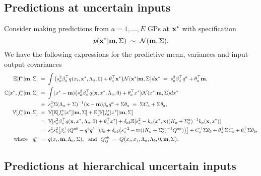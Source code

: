 \documentclass{article}
\newcommand{\bff}{{\bf f}}
\newcommand{\bfm}{{\bf m}}
\newcommand{\bfx}{{\bf x}}
\newcommand{\E}{{\mathbb E}}
\newcommand{\V}{{\mathbb V}}
\newcommand{\C}{{\mathbb C}}
\begin{document}
\subsection*{Predictions at uncertain inputs}

Consider making predictions from $a=1,\ldots,E$ GPs at $\bfx^*$ with specification
\begin{equation}
p(\bfx^*|\bfm,\Sigma)\;\sim\;{\cal N}(\bfm, \Sigma).
\end{equation}
%
We have the following expressions for the predictive mean, variances
and input output covariances
\begin{align}
\E[\bff^*|\bfm,\Sigma]\;&=\;\int\big(s_a^2\beta_a^\top
q(x_i,\bfx^*,\Lambda_a,0)+\theta_a^\top\bfx^*\big){\cal N}(\bfx^*|\bfm,\Sigma)d\bfx^*\;=\;s_a^2\beta_a^\top q^a+\theta_a^\top \bfm,\label{eq:m}\\
\C[x^*,f_a^*|\bfm,\Sigma]\;&=\;\int (x^*-\bfm)\big(s^2_a\beta_a^\top
q(\bfx,x^*,\Lambda_a,0)+\theta_a^\top x^*\big){\cal
  N}(x^*|\bfm,\Sigma)dx^*\nonumber\\
&=\;s^2_a\Sigma(\Lambda_a+\Sigma)^{-1}(\bfx-\bfm)\beta_aq^a+\Sigma\theta_a\;=\;
\Sigma C_a+\Sigma\theta_a,\label{eq:c}\\
\V[f_a^*|\bfm,\Sigma]\;&=\;\V[\E[f_a^*|x^*]|\bfm,\Sigma]+\E[\V[f_a^*|x^*]|\bfm,\Sigma]\nonumber\\
&=\;\V[s_a^2\beta_a^\top q(\bfx,x^*,\Lambda_a,0)+\theta_a^\top x^*]+\delta_{ab}\E[s_a^2-k_a(x^*,\bfx)(K_a+\Sigma_\varepsilon^a)^{-1}k_a(\bfx,x^*)]\label{eq:v}\\
&=\;s_a^2s_b^2\big[\beta_a^\top (Q^{ab}-q^aq^{b\top})\beta_b
+\delta_{ab}\big(s_a^{-2}-\operatorname{tr}((K_a+\Sigma_\varepsilon^a)^{-1}Q^{aa})\big)\big]
+C_a^\top\Sigma\theta_b+\theta_a^\top\Sigma C_b+\theta_a^\top\Sigma\theta_b,\nonumber\\
\text{\ \ where\ \ }\;q^a_i\;&=\;q(x_i,\bfm,\Lambda_a,\Sigma), \text{\ \ and\ \ }
Q^{ab}_{ij}\;=\;Q\big(x_i,x_j,\Lambda_a,\Lambda_b,0,\bfm,\Sigma\big).\nonumber
\end{align}

\subsection*{Predictions at hierarchical uncertain inputs}
\end{document}

